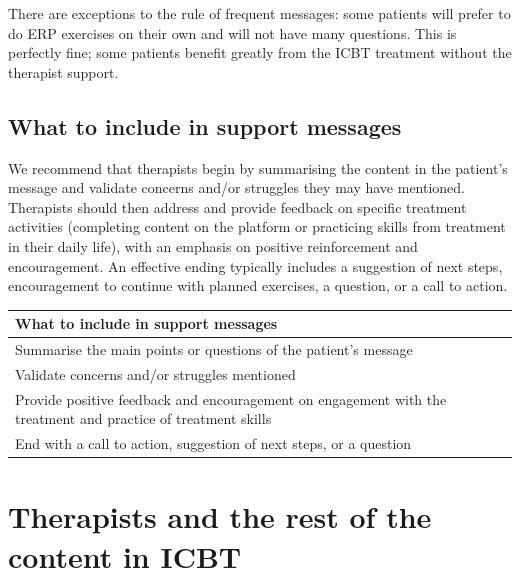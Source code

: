 \documentclass[]{book}
\theoremstyle{definition}
\theoremstyle{definition}
\theoremstyle{definition}
\theoremstyle{remark}
\begin{document}
There are exceptions to the rule of frequent messages: some patients
will prefer to do ERP exercises on their own and will not have many
questions. This is perfectly fine; some patients benefit greatly from
the ICBT treatment without the therapist support.

\hypertarget{what-to-include-in-support-messages}{%
\subsection{What to include in support
messages}\label{what-to-include-in-support-messages}}

We recommend that therapists begin by summarising the content in the
patient's message and validate concerns and/or struggles they may have
mentioned. Therapists should then address and provide feedback on
specific treatment activities (completing content on the platform or
practicing skills from treatment in their daily life), with an emphasis
on positive reinforcement and encouragement. An effective ending
typically includes a suggestion of next steps, encouragement to continue
with planned exercises, a question, or a call to action.

\begin{longtable}[]{@{}l@{}}
\toprule
\begin{minipage}[b]{0.97\columnwidth}\raggedright
\textbf{What to include in support messages}\strut
\end{minipage}\tabularnewline
\midrule
\endhead
\begin{minipage}[t]{0.97\columnwidth}\raggedright
Summarise the main points or questions of the patient's message\strut
\end{minipage}\tabularnewline
\begin{minipage}[t]{0.97\columnwidth}\raggedright
Validate concerns and/or struggles mentioned\strut
\end{minipage}\tabularnewline
\begin{minipage}[t]{0.97\columnwidth}\raggedright
Provide positive feedback and encouragement on engagement with the
treatment and practice of treatment skills\strut
\end{minipage}\tabularnewline
\begin{minipage}[t]{0.97\columnwidth}\raggedright
End with a call to action, suggestion of next steps, or a question\strut
\end{minipage}\tabularnewline
\bottomrule
\end{longtable}

\hypertarget{therapists-and-the-rest-of-the-content-in-icbt}{%
\section{Therapists and the rest of the content in
ICBT}\label{therapists-and-the-rest-of-the-content-in-icbt}}
\end{document}

